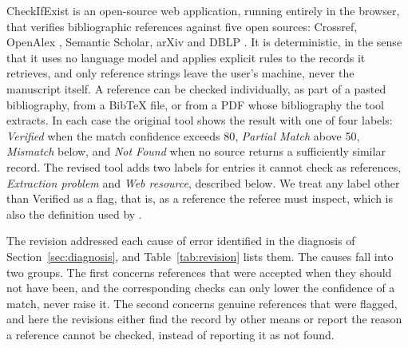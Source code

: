 \documentclass[pdflatex,sn-apa]{sn-jnl}
\begin{document}
CheckIfExist is an open-source web application, running entirely in the browser, that verifies bibliographic references against five open sources: Crossref, OpenAlex \citep{priem2022}, Semantic Scholar, arXiv and DBLP \citep{abbonato2026}. It is deterministic, in the sense that it uses no language model and applies explicit rules to the records it retrieves, and only reference strings leave the user's machine, never the manuscript itself. A reference can be checked individually, as part of a pasted bibliography, from a BibTeX file, or from a PDF whose bibliography the tool extracts. In each case the original tool shows the result with one of four labels: \emph{Verified} when the match confidence exceeds 80, \emph{Partial Match} above 50, \emph{Mismatch} below, and \emph{Not Found} when no source returns a sufficiently similar record. The revised tool adds two labels for entries it cannot check as references, \emph{Extraction problem} and \emph{Web resource}, described below. We treat any label other than Verified as a flag, that is, as a reference the referee must inspect, which is also the definition used by \citet{badalova2026}.

The revision addressed each cause of error identified in the diagnosis of Section~\ref{sec:diagnosis}, and Table~\ref{tab:revision} lists them. The causes fall into two groups. The first concerns references that were accepted when they should not have been, and the corresponding checks can only lower the confidence of a match, never raise it. The second concerns genuine references that were flagged, and here the revisions either find the record by other means or report the reason a reference cannot be checked, instead of reporting it as not found.
\end{document}
